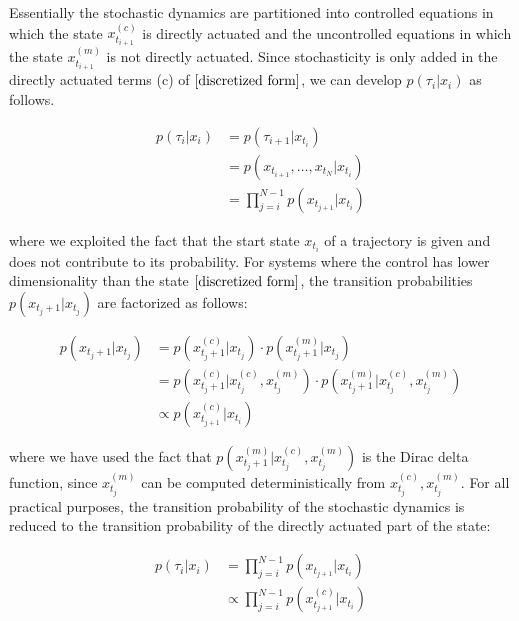 \documentclass[journal]{IEEEtran}
\begin{document}
Essentially the stochastic dynamics are partitioned into controlled equations in which the state $x_{t_{i+1}}^{(c)}$
is directly actuated and the uncontrolled equations in which the state $x_{t_{i+1}}^{(m)}$ is not directly actuated. 
Since stochasticity is only added in the directly actuated terms (c) of $\ref{discretized form}$, we can develop $p(\tau_i|x_i)$ as follows.

\begin{equation}
  \begin{aligned}
    p(\tau_i|x_i) & =  p(\tau_{i+1}|x_{t_i})  \\ 
    & = p(x_{t_{i+1}},\ldots, x_{t_N}|x_{t_i}) \\
    & = \prod_{j = i}^{N-1} p (x_{t_{j+1}}|x_{t_i}) \nonumber
  \end{aligned}
\end{equation}


where we exploited the fact that the start state $x_{t_i}$ of a trajectory is given and does not contribute to its probability. 
For systems where the control has lower dimensionality than the state $\ref{discretized form}$, the transition probabilities $p (x_{t_j+1} |x_{t_j} )$ are factorized as follows:

\begin{equation}
  \begin{aligned}
    p (x_{t_j+1} |x_{t_j} ) & =  p (x_{t_j+1}^{(c)} |x_{t_j} ) \cdot p (x_{t_j+1}^{(m)} |x_{t_j} ) \\ 
    & = p (x_{t_j+1}^{(c)} |x_{t_j}^{(c)}, x_{t_j}^{(m)} )\cdot p (x_{t_j+1}^{(m)} |x_{t_j}^{(c)}, x_{t_j}^{(m)}) \\
    & \propto p (x_{t_{j+1}}^{(c)}|x_{t_i}) 
  \end{aligned}
  \label{factorized transition probabilities}
\end{equation}


where we have used the fact that $p (x_{t_j+1}^{(m)} |x_{t_j}^{(c)}, x_{t_j}^{(m)})$ is the Dirac delta function, since $x_{t_j}^{(m)}$ can be 
computed deterministically from $x_{t_j}^{(c)}, x_{t_j}^{(m)}$. For all practical purposes, the transition probability of
the stochastic dynamics is reduced to the transition probability of the directly actuated part of the
state:

\begin{equation}
  \begin{aligned}
    p(\tau_i|x_i) & =  \prod_{j = i}^{N-1} p (x_{t_{j+1}}|x_{t_i})\\ 
    & \propto \prod_{j = i}^{N-1} p (x_{t_{j+1}}^{(c)}|x_{t_i})
  \end{aligned}
  \label{transition dynamic}
\end{equation}
\end{document}
